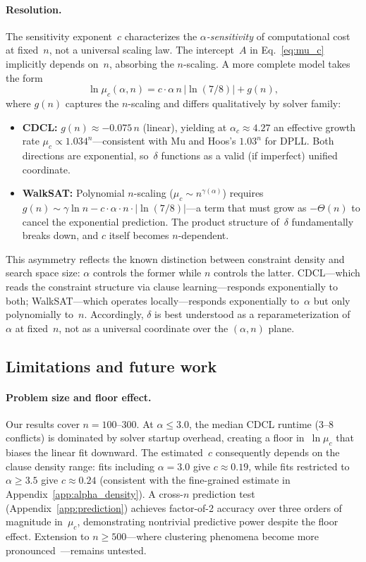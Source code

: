 \documentclass[11pt,a4paper]{article}
\newcommand{\mc}{\mu_c}
\begin{document}
\paragraph{Resolution.}
The sensitivity exponent~$c$ characterizes the
\emph{$\alpha$-sensitivity} of computational cost at fixed~$n$,
not a universal scaling law.
The intercept~$A$ in Eq.~\eqref{eq:mu_c} implicitly depends
on~$n$, absorbing the $n$-scaling.
A more complete model takes the form
\[
\ln \mc(\alpha, n) = c \cdot \alpha \, n \, |\!\ln(7/8)| + g(n),
\]
where $g(n)$ captures the $n$-scaling and differs qualitatively
by solver family:
\begin{itemize}
\item \textbf{CDCL:} $g(n) \approx -0.075\,n$ (linear),
  yielding at $\alpha_c \approx 4.27$ an effective growth rate
  $\mc \propto 1.034^n$---consistent with Mu and Hoos's
  $1.03^n$ for DPLL.
  Both directions are exponential, so~$\delta$ functions
  as a valid (if imperfect) unified coordinate.
\item \textbf{WalkSAT:} Polynomial $n$-scaling
  ($\mc \sim n^{\gamma(\alpha)}$)
  requires $g(n) \sim \gamma \ln n
  - c \cdot \alpha \cdot n \cdot |\!\ln(7/8)|$---a term that
  must grow as $-\Theta(n)$ to cancel the exponential prediction.
  The product structure of~$\delta$ fundamentally breaks down,
  and $c$ itself becomes $n$-dependent.
\end{itemize}

This asymmetry reflects the known distinction
between constraint density and search space size:
$\alpha$ controls the former while $n$ controls the latter.
CDCL---which reads the constraint structure via clause
learning---responds exponentially to both;
WalkSAT---which operates locally---responds exponentially
to~$\alpha$ but only polynomially to~$n$.
Accordingly, $\delta$ is best understood as a
reparameterization of~$\alpha$ at fixed~$n$,
not as a universal coordinate over the
$(\alpha, n)$ plane.

\subsection{Limitations and future work}

\paragraph{Problem size and floor effect.}
Our results cover $n = 100$--$300$.
At $\alpha \leq 3.0$, the median CDCL runtime (3--8 conflicts)
is dominated by solver startup overhead, creating a floor
in~$\ln \mc$ that biases the linear fit downward.
The estimated~$c$ consequently depends on the clause density
range: fits including $\alpha = 3.0$ give $c \approx 0.19$,
while fits restricted to $\alpha \geq 3.5$ give $c \approx 0.24$
(consistent with the fine-grained estimate in
Appendix~\ref{app:alpha_density}).
A cross-$n$ prediction test (Appendix~\ref{app:prediction})
achieves factor-of-2 accuracy over three orders of magnitude
in~$\mc$, demonstrating nontrivial predictive power despite
the floor effect.
Extension to $n \geq 500$---where clustering phenomena
become more pronounced~\cite{Achlioptas2008}---remains untested.
\end{document}
